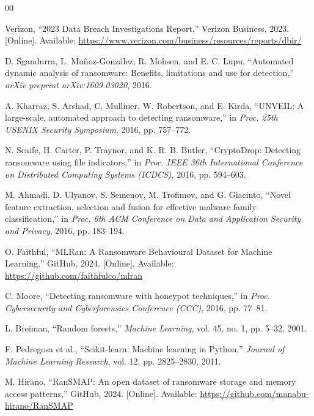 \documentclass[conference]{IEEEtran}
\begin{document}
\begin{thebibliography}{00}

Verizon, ``2023 Data Breach Investigations Report,''
Verizon Business, 2023. [Online]. Available:
\url{https://www.verizon.com/business/resources/reports/dbir/}

D. Sgandurra, L. Mu\~{n}oz-Gonz\'{a}lez, R. Mohsen,
and E. C. Lupu, ``Automated dynamic analysis of ransomware:
Benefits, limitations and use for detection,''
\textit{arXiv preprint arXiv:1609.03020}, 2016.

A. Kharraz, S. Arshad, C. Mulliner, W. Robertson,
and E. Kirda, ``UNVEIL: A large-scale, automated approach
to detecting ransomware,'' in \textit{Proc. 25th USENIX
Security Symposium}, 2016, pp. 757--772.

N. Scaife, H. Carter, P. Traynor, and K. R. B. Butler,
``CryptoDrop: Detecting ransomware using file indicators,''
in \textit{Proc. IEEE 36th International Conference on
Distributed Computing Systems (ICDCS)}, 2016, pp. 594--603.

M. Ahmadi, D. Ulyanov, S. Semenov, M. Trofimov, and
G. Giacinto, ``Novel feature extraction, selection and
fusion for effective malware family classification,''
in \textit{Proc. 6th ACM Conference on Data and Application
Security and Privacy}, 2016, pp. 183--194.

O. Faithful, ``MLRan: A Ransomware Behavioural Dataset
for Machine Learning,'' GitHub, 2024. [Online]. Available:
\url{https://github.com/faithfulco/mlran}

C. Moore, ``Detecting ransomware with honeypot techniques,''
in \textit{Proc. Cybersecurity and Cyberforensics Conference
(CCC)}, 2016, pp. 77--81.

L. Breiman, ``Random forests,''
\textit{Machine Learning}, vol. 45, no. 1, pp. 5--32, 2001.

F. Pedregosa et al., ``Scikit-learn: Machine learning in
Python,'' \textit{Journal of Machine Learning Research},
vol. 12, pp. 2825--2830, 2011.

M. Hirano, ``RanSMAP: An open dataset of ransomware storage
and memory access patterns,'' GitHub, 2024. [Online].
Available: \url{https://github.com/manabu-hirano/RanSMAP}

\end{thebibliography}
\end{document}
